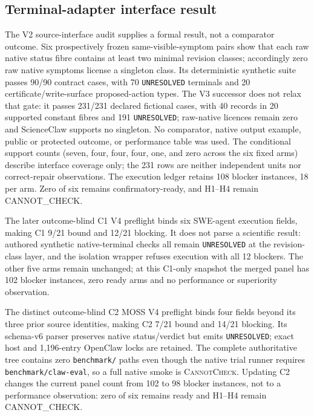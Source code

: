 \subsection*{Terminal-adapter interface result}

The V2 source-interface audit supplies a formal result, not a comparator
outcome. Six prospectively frozen same-visible-symptom pairs show that each raw
native status fibre contains at least two minimal revision classes; accordingly
zero raw native symptoms license a singleton class. Its deterministic synthetic
suite passes 90/90 contract cases, with 70 \texttt{UNRESOLVED} terminals and 20
certificate/write-surface proposed-action types. The V3 successor does not
relax that gate: it passes 231/231 declared fictional cases, with 40 records in
20 supported constant fibres and 191 \texttt{UNRESOLVED}; raw-native licences
remain zero and ScienceClaw supports no singleton. No comparator, native output
example, public or protected outcome, or performance table was used. The
conditional support counts (seven, four, four, four, one, and zero across the
six fixed arms) describe interface coverage only; the 231 rows are neither
independent units nor correct-repair observations. The execution ledger retains
108 blocker instances, 18 per arm. Zero of six remains confirmatory-ready, and
H1--H4 remain \textsf{CANNOT\_CHECK}.

The later outcome-blind C1 V4 preflight binds six SWE-agent execution fields,
making C1 9/21 bound and 12/21 blocking. It does not parse a scientific result:
authored synthetic native-terminal checks all remain
\texttt{UNRESOLVED} at the revision-class layer, and the isolation wrapper
refuses execution with all 12 blockers. The other five arms remain unchanged;
at this C1-only snapshot the merged panel has 102 blocker instances, zero ready
arms and no performance or superiority observation.

The distinct outcome-blind C2 MOSS V4 preflight binds four fields beyond its
three prior source identities, making C2 7/21 bound and 14/21 blocking. Its
schema-v6 parser preserves native status/verdict but emits
\texttt{UNRESOLVED}; exact host and 1,196-entry OpenClaw locks are retained.
The complete authoritative tree contains zero \texttt{benchmark/} paths even
though the native trial runner requires \texttt{benchmark/claw-eval}, so a full
native smoke is \textsc{CannotCheck}. Updating C2 changes the current panel
count from 102 to 98 blocker instances, not to a performance observation: zero
of six remains ready and H1--H4 remain \textsf{CANNOT\_CHECK}.

